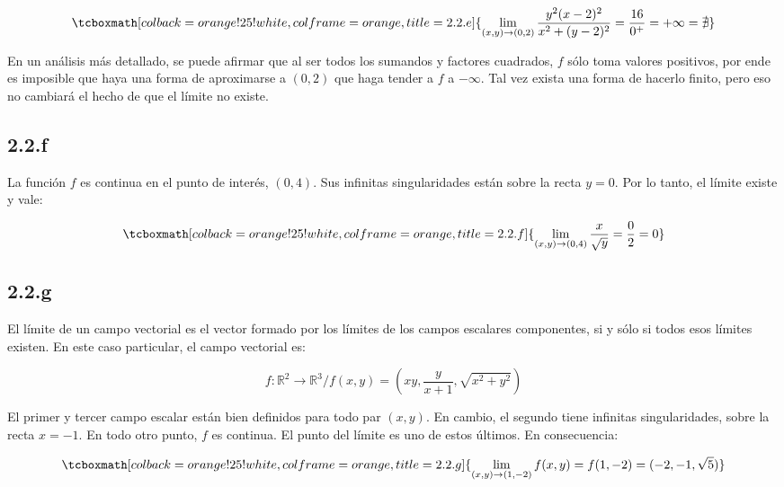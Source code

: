 \documentclass{article}
\renewcommand{\Bbb}{\mathbb}
\begin{document}
\begin{equation}
\tcboxmath[colback=orange!25!white,colframe=orange,title=2.2.e]
{ \lim_{(x,y) \rightarrow (0,2)} \frac{y^2 (x-2)^2}{x^2 + (y-2)^2} = \frac{16}{0^+} = +\infty = \nexists }
\end{equation}

En un análisis más detallado, se puede afirmar que al ser todos los sumandos y factores cuadrados, $f$ sólo toma valores positivos, por ende es imposible que haya una forma de aproximarse a $(0,2)$ que haga tender a $f$ a $-\infty$. Tal vez exista una forma de hacerlo finito, pero eso no cambiará el hecho de que el límite no existe. 

\subsection*{2.2.f}
\label{subsec:2.2.f}

La función $f$ es continua en el punto de interés, $(0, 4)$. Sus infinitas singularidades están sobre la recta $y = 0$. Por lo tanto, el límite existe y vale:

\begin{equation}
\tcboxmath[colback=orange!25!white,colframe=orange,title=2.2.f]
{ \lim_{(x,y) \rightarrow (0,4)} \frac{x}{\sqrt{y}} = \frac{0}{2} = 0 }
\end{equation}

\subsection*{2.2.g}
\label{subsec:2.2.g}

El límite de un campo vectorial es el vector formado por los límites de los campos escalares componentes, si y sólo si todos esos límites existen. En este caso particular, el campo vectorial es:

\begin{equation}
f: \Bbb R^2 \rightarrow \Bbb R^3 / f(x,y) = \left( x y, \frac{y}{x+1}, \sqrt{x^2 + y^2} \right)
\end{equation}

El primer y tercer campo escalar están bien definidos para todo par $(x,y)$. En cambio, el segundo tiene infinitas singularidades, sobre la recta $x = -1$. En todo otro punto, $f$ es continua. El punto del límite es uno de estos últimos. En consecuencia:

\begin{equation}
\tcboxmath[colback=orange!25!white,colframe=orange,title=2.2.g]
{ \lim_{(x,y) \rightarrow (1,-2)} f(x,y) = f(1,-2) = (-2, -1, \sqrt{5}) }
\end{equation}
\end{document}
